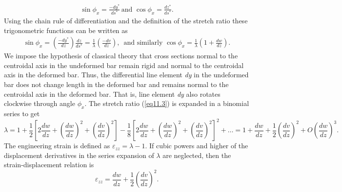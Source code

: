 \documentclass{AeroStructure-ERJohnson}
\begin{document}
\begin{align}\label{eq11.4}
 \sin \phi_{x}=\frac{-d y^{*}}{d s^{*}}\,\textrm{and } \cos\phi_{x}=\frac{d z^{*}}{d s^{*}}.
\end{align}
\noindent Using the chain rule of differentiation and the definition of the stretch ratio these trigonometric functions can be written as
\begin{align}\label{eq11.5}
 \sin \phi_{x}=\left(\frac{-d y^{*}}{d z}\right) \frac{d z}{d s^{*}}=\frac{1}{\lambda}\left(\frac{-d v}{d z}\right),\,\textrm{ and similarly } \cos\phi_{x}=\frac{1}{\lambda}\left(1+\frac{d w}{d z}\right).
\end{align}
We impose the hypothesis of classical theory that cross sections normal to the centroidal axis in the undeformed bar remain rigid and normal to the centroidal axis in the deformed bar. Thus, the differential line element \textit{dy} in the undeformed bar does not change length in the deformed bar and remains normal to the centroidal\vadjust{\vspace*{8pt}\pagebreak} axis in the deformed bar. That is, line element \textit{dy} also rotates clockwise through angle $ \phi_{x}$. The stretch ratio (\ref{eq11.3}) is expanded in a binomial series to\vspace*{-3pt} get
\begin{equation}
\lambda=1+\frac{1}{2}\left[2 \frac{d w}{d z}+\left(\frac{d w}{d z}\right)^{2}+\left(\frac{d v}{d z}\right)^{2}\right]-\frac{1}{8}\left[2 \frac{d w}{d z}+\left(\frac{d w}{d z}\right)^{2}+\left(\frac{d v}{d z}\right)^{2}\right]^{2}+\ldots=1+\frac{d w}{d z}+\frac{1}{2}\left(\frac{d v}{d z}\right)^{2}+O\left(\frac{d w}{d z}\right)^{3}. \label{eq11.6}
\end{equation}
The engineering strain is defined as $\varepsilon_{z z}=\lambda-1$. If cubic powers and higher of the displacement derivatives in the series expansion of $ \lambda $ are neglected, then the strain-displacement relation\vspace*{-3pt} is
\begin{equation}
\varepsilon_{z z}=\frac{d w}{d z}+\frac{1}{2}\left(\frac{d v}{d z}\right)^{2}. \label{eq11.7}
\end{equation}
\end{document}
